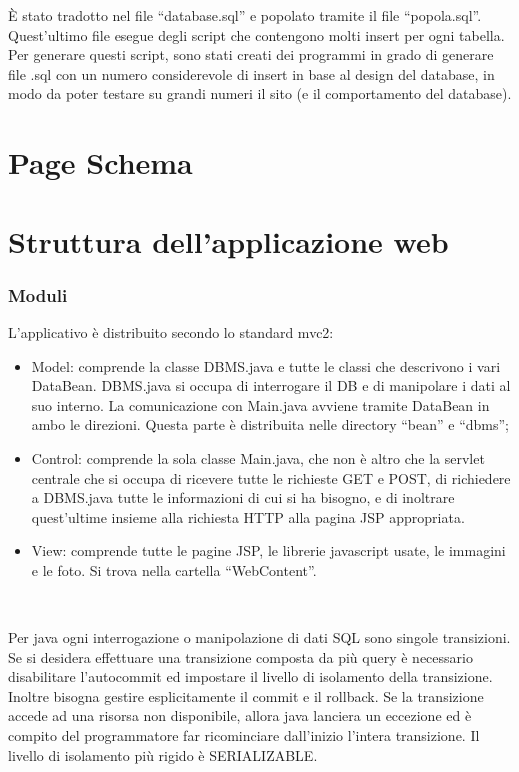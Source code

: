 \documentclass[a4paper,titlepage]{article}
\begin{document}
È stato tradotto nel file ``database.sql'' e popolato tramite il file ``popola.sql''. Quest'ultimo file esegue degli script che contengono molti insert per ogni tabella.
Per generare questi script, sono stati creati dei programmi in grado di generare file .sql con un numero considerevole di insert in base al design del database, in modo da poter testare su grandi numeri il sito (e il comportamento del database).

\newpage
\part{Page Schema}



\part{Struttura dell'applicazione web}

\section{Moduli}
L'applicativo è distribuito secondo lo standard mvc2:

\begin{itemize}[leftmargin=0.5cm, topsep=0.25cm, itemsep=0.2cm]
\item Model: comprende la classe DBMS.java e tutte le classi che descrivono i vari DataBean. DBMS.java si occupa di interrogare il DB e di manipolare i dati al suo interno. La comunicazione con Main.java avviene tramite DataBean in ambo le direzioni. Questa parte è distribuita nelle directory ``bean'' e ``dbms'';
\item Control: comprende la sola classe Main.java, che non è altro che la servlet centrale che si occupa di ricevere tutte le richieste GET e POST, di richiedere a 
DBMS.java tutte le informazioni di cui si ha bisogno, e di inoltrare quest'ultime insieme alla richiesta HTTP alla pagina JSP appropriata.
\item View: comprende tutte le pagine JSP, le librerie javascript usate, le immagini e le foto. Si trova nella cartella ``WebContent''.

\end{itemize}

~

Per java ogni interrogazione o manipolazione di dati SQL sono singole transizioni. Se si desidera effettuare una transizione composta da più query è necessario disabilitare l'autocommit ed impostare il livello di isolamento della transizione. Inoltre bisogna gestire esplicitamente il commit e il rollback. Se la transizione accede ad una risorsa non disponibile, allora java lanciera un eccezione ed è compito del programmatore far ricominciare dall'inizio l'intera transizione. Il livello di isolamento più rigido è SERIALIZABLE.
\end{document}
